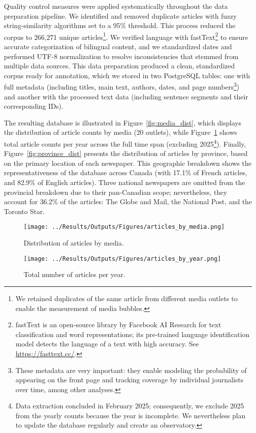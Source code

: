 \documentclass[12pt]{article}
\begin{document}
Quality control measures were applied systematically throughout the data preparation pipeline. We identified and removed duplicate articles with fuzzy string-similarity algorithms set to a 95\% threshold. This process reduced the corpus to 266,271 unique articles\footnote{We retained duplicates of the same article from different media outlets to enable the measurement of media bubbles.}. We verified language with fastText\footnote{fastText is an open-source library by Facebook AI Research for text classification and word representations; its pre-trained language identification model detects the language of a text with high accuracy. See \url{https://fasttext.cc/}.} to ensure accurate categorization of bilingual content, and we standardized dates and performed UTF-8 normalization to resolve inconsistencies that stemmed from multiple data sources. This data preparation produced a clean, standardized corpus ready for annotation, which we stored in two PostgreSQL tables: one with full metadata (including titles, main text, authors, dates, and page numbers\footnote{These metadata are very important: they enable modeling the probability of appearing on the front page and tracking coverage by individual journalists over time, among other analyses.}) and another with the processed text data (including sentence segments and their corresponding IDs).

The resulting database is illustrated in Figure~\ref{fig:media_dist}, which displays the distribution of article counts by media (20 outlets), while Figure~\ref{fig:year_counts} shows total article counts per year across the full time span (excluding 2025\footnote{Data extraction concluded in February 2025; consequently, we exclude 2025 from the yearly counts because the year is incomplete. We nevertheless plan to update the database regularly and create an observatory.}). Finally, Figure~\ref{fig:province_dist} presents the distribution of articles by province, based on the primary location of each newspaper. This geographic breakdown shows the representativeness of the database across Canada (with 17.1\% of French articles, and 82.9\% of English articles). Three national newspapers are omitted from the provincial breakdown due to their pan-Canadian scope; nevertheless, they account for 36.2\% of the articles: The Globe and Mail, the National Post, and the Toronto Star.

\begin{figure}[!htbp]
  \centering
  \begin{minipage}[c]{0.48\textwidth}
    \centering
    \texttt{[image: ../Results/Outputs/Figures/articles\_by\_media.png]}
    \caption{Distribution of articles by media.}
    \label{fig:media_dist}
      \end{minipage}
  \hspace{0.02\textwidth}
  \begin{minipage}[c]{0.48\textwidth}
    \centering
    \texttt{[image: ../Results/Outputs/Figures/articles\_by\_year.png]}
    \caption{Total number of articles per year.}
    \label{fig:year_counts}
      \end{minipage}
\end{figure}
\end{document}

